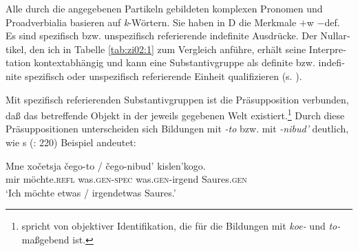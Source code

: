 \documentclass[output=paper, colorlinks, citecolor=brown, booklanguage=german]{langscibook}
\begin{document}
\begin{otherlanguage}{german}
\iffalse
\ea\label{ex:02:merkmale}
\begin{tabbing}
 \hspace{5cm}                    \= w \hspace{.5cm}   \= def \hspace{.5cm} \= spez \hspace{.5cm}    \= neg \\
koe-                            \> +                \> -                \> +                    \> - \\
-to                             \> +                \> -                \> +                    \> - \\
-nibud'/-libo/ by to ni bylo    \> +                \> -                \> -                    \> - \\
ni-                             \> +                \> -                \> -                    \> + \\
$\varnothing$                   \> -                \>                  \>                      \> - \\
\end{tabbing}
\z 

\fi 

Alle durch die angegebenen Partikeln gebildeten komplexen Pronomen und Proadverbialia basieren auf \textit{k}-Wörtern. Sie haben in D die Merkmale $+$w $-$def. Es sind spezifisch bzw. unspezifisch referierende indefinite Ausdrücke. Der Nullartikel, den ich in Tabelle \ref{tab:zi02:1} zum Vergleich anführe, erhält seine Interpretation kontextabhängig und kann eine Substantivgruppe als definite bzw. indefinite spezifisch oder unspezifisch referierende Einheit qualifizieren (s. \citealt{Steube.Spaeth1998}).

Mit spezifisch referierenden Substantivgruppen ist die Präsupposition verbunden, daß das betreffende Objekt in der jeweils gegebenen Welt existiert.\footnote{\citet{Ruzicka1973} spricht von objektiver Identifikation, die für die Bildungen mit \textit{koe-} und \textit{to-} maßgebend ist.} Durch diese Präsuppositionen unterscheiden sich Bildungen mit \textit{-to} bzw. mit \textit{-nibud'} deutlich, wie \citeauthor{Paduceva1985}s (\citeyear{Paduceva1985}: 220) Beispiel andeutet:

\ea\label{ex:02:kislenkogo}
\gll Mne xočetsja čego-to / čego-nibud' kislen'kogo.\\
mir möchte.\textsc{refl} was.\textsc{gen}-\textsc{spec} {} was.\textsc{gen}-irgend Saures.\textsc{gen} \\
\glt ‘Ich möchte etwas / irgendetwas Saures.’ 
\z 


\end{otherlanguage}
\end{document}
